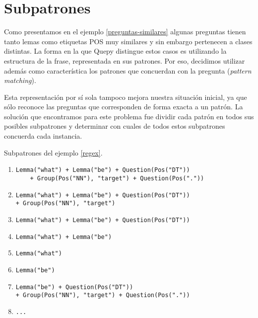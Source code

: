 \section{Subpatrones}

Como presentamos en el ejemplo \ref{preguntas-similares} algunas preguntas tienen tanto lemas como etiquetas POS muy similares y sin embargo pertenecen a clases distintas. La forma en la que Quepy distingue estos casos es utilizando la estructura de la frase, representada en sus patrones. Por eso, decidimos utilizar además como característica los patrones que concuerdan con la pregunta (\textit{pattern matching}).

Esta representación por sí sola tampoco mejora nuestra situación inicial, ya que sólo reconoce las preguntas que corresponden de forma exacta a un patrón. La solución que encontramos para este problema fue dividir cada patrón en todos sus posibles subpatrones y determinar con cuales de todos estos subpatrones concuerda cada instancia.

\begin{example} Subpatrones del ejemplo \ref{regex}.
\begin{enumerate}
\item \begin{lstlisting}
Lemma("what") + Lemma("be") + Question(Pos("DT"))
    + Group(Pos("NN"), "target") + Question(Pos("."))
\end{lstlisting}

\item
\begin{lstlisting}
Lemma("what") + Lemma("be") + Question(Pos("DT"))
+ Group(Pos("NN"), "target")
\end{lstlisting}

\item
\begin{lstlisting}
Lemma("what") + Lemma("be") + Question(Pos("DT"))
\end{lstlisting}

\item
\begin{lstlisting}
Lemma("what") + Lemma("be")
\end{lstlisting}

\item
\begin{lstlisting}
Lemma("what")
\end{lstlisting}

\item
\begin{lstlisting}
Lemma("be")
\end{lstlisting}

\item
\begin{lstlisting}
Lemma("be") + Question(Pos("DT"))
+ Group(Pos("NN"), "target") + Question(Pos("."))
\end{lstlisting}

\item
\begin{lstlisting}
...
\end{lstlisting}
\end{enumerate}
\end{example}

